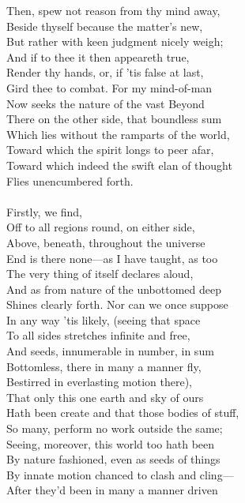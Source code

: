 Then, spew not reason from thy mind away,\\
Beside thyself because the matter's new,\\
But rather with keen judgment nicely weigh;\\
And if to thee it then appeareth true,\\
Render thy hands, or, if 'tis false at last,\\
Gird thee to combat. For my mind-of-man\\
Now seeks the nature of the vast Beyond\\
There on the other side, that boundless sum\\
Which lies without the ramparts of the world,\\
Toward which the spirit longs to peer afar,\\
Toward which indeed the swift elan of thought\\
Flies unencumbered forth.\\
\\
Firstly, we find,\\
Off to all regions round, on either side,\\
Above, beneath, throughout the universe\\
End is there none—as I have taught, as too\\
The very thing of itself declares aloud,\\
And as from nature of the unbottomed deep\\
Shines clearly forth. Nor can we once suppose\\
In any way 'tis likely, (seeing that space\\
To all sides stretches infinite and free,\\
And seeds, innumerable in number, in sum\\
Bottomless, there in many a manner fly,\\
Bestirred in everlasting motion there),\\
That only this one earth and sky of ours\\
Hath been create and that those bodies of stuff,\\
So many, perform no work outside the same;\\
Seeing, moreover, this world too hath been\\
By nature fashioned, even as seeds of things\\
By innate motion chanced to clash and cling—\\
After they'd been in many a manner driven\\
